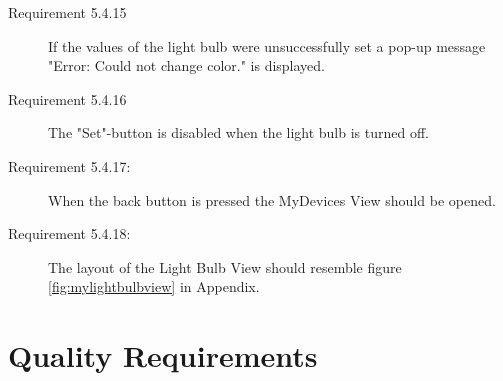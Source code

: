\documentclass[a4paper]{article}
\begin{document}
\begin{description}
\item[Requirement 5.4.15] If the values of the light bulb were unsuccessfully set a pop-up message "Error: Could not change color." is displayed.

\item[Requirement 5.4.16] The "Set"-button is disabled when the light bulb is turned off.

\item[Requirement 5.4.17:] When the back button is pressed the MyDevices View should be opened.

\item[Requirement 5.4.18:] The layout of the Light Bulb View should resemble figure \ref{fig:mylightbulbview} in Appendix.

\end{description}

\section{Quality Requirements}
\end{document}
